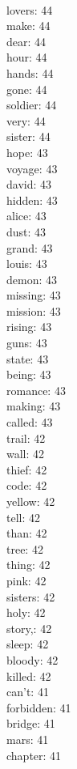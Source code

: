 \begin{multicols}{6}
  \\ lovers: 44
  \\ make: 44
  \\ dear: 44
  \\ hour: 44
  \\ hands: 44
  \\ gone: 44
  \\ soldier: 44
  \\ very: 44
  \\ sister: 44
  \\ hope: 43
  \\ voyage: 43
  \\ david: 43
  \\ hidden: 43
  \\ alice: 43
  \\ dust: 43
  \\ grand: 43
  \\ louis: 43
  \\ demon: 43
  \\ missing: 43
  \\ mission: 43
  \\ rising: 43
  \\ guns: 43
  \\ state: 43
  \\ being: 43
  \\ romance: 43
  \\ making: 43
  \\ called: 43
  \\ trail: 42
  \\ wall: 42
  \\ thief: 42
  \\ code: 42
  \\ yellow: 42
  \\ tell: 42
  \\ than: 42
  \\ tree: 42
  \\ thing: 42
  \\ pink: 42
  \\ sisters: 42
  \\ holy: 42
  \\ story,: 42
  \\ sleep: 42
  \\ bloody: 42
  \\ killed: 42
  \\ can't: 41
  \\ forbidden: 41
  \\ bridge: 41
  \\ mars: 41
  \\ chapter: 41

\end{multicols}
